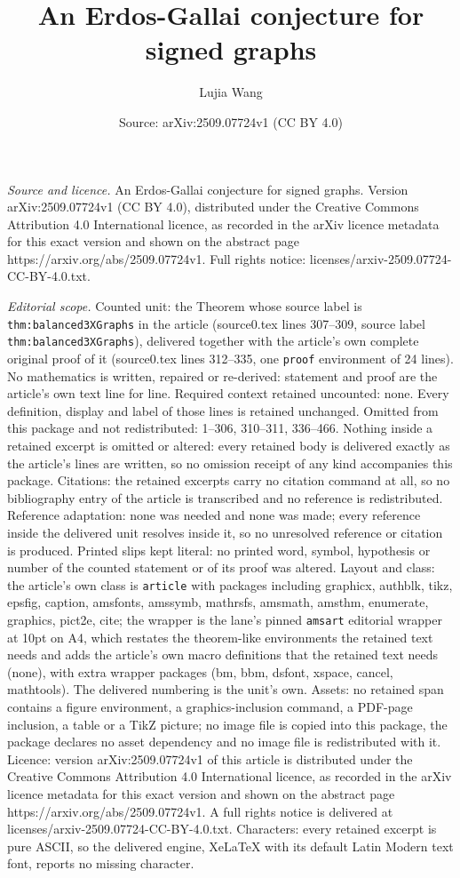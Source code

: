 \documentclass[10pt,a4paper]{amsart}
\title[An Erdos-Gallai conjecture for signed graphs]{An Erdos-Gallai conjecture for signed graphs}
\author{Lujia Wang}
\date{Source: arXiv:2509.07724v1 (CC BY 4.0)}
\begin{document}
\maketitle

\noindent\emph{Source and licence.} An Erdos-Gallai conjecture for signed graphs. Version arXiv:2509.07724v1 (CC BY 4.0), distributed under the Creative Commons Attribution 4.0 International licence, as recorded in the arXiv licence metadata for this exact version and shown on the abstract page https://arxiv.org/abs/2509.07724v1. Full rights notice: licenses/arxiv-2509.07724-CC-BY-4.0.txt.\par\smallskip

\noindent\textit{Editorial scope.} Counted unit: the Theorem whose source label is \texttt{thm:balanced3XGraphs} in the article (source0.tex lines 307--309, source label \texttt{thm:balanced3XGraphs}), delivered together with the article's own complete original proof of it (source0.tex lines 312--335, one \texttt{proof} environment of 24 lines). No mathematics is written, repaired or re-derived: statement and proof are the article's own text line for line. Required context retained uncounted: none. Every definition, display and label of those lines is retained unchanged. Omitted from this package and not redistributed: 1--306, 310--311, 336--466. Nothing inside a retained excerpt is omitted or altered: every retained body is delivered exactly as the article's lines are written, so no omission receipt of any kind accompanies this package. Citations: the retained excerpts carry no citation command at all, so no bibliography entry of the article is transcribed and no reference is redistributed. Reference adaptation: none was needed and none was made; every reference inside the delivered unit resolves inside it, so no unresolved reference or citation is produced. Printed slips kept literal: no printed word, symbol, hypothesis or number of the counted statement or of its proof was altered. Layout and class: the article's own class is \texttt{article} with packages including graphicx, authblk, tikz, epsfig, caption, amsfonts, amssymb, mathrsfs, amsmath, amsthm, enumerate, graphics, pict2e, cite; the wrapper is the lane's pinned \texttt{amsart} editorial wrapper at 10pt on A4, which restates the theorem-like environments the retained text needs and adds the article's own macro definitions that the retained text needs (none), with extra wrapper packages (bm, bbm, dsfont, xspace, cancel, mathtools). The delivered numbering is the unit's own. Assets: no retained span contains a figure environment, a graphics-inclusion command, a PDF-page inclusion, a table or a TikZ picture; no image file is copied into this package, the package declares no asset dependency and no image file is redistributed with it. Licence: version arXiv:2509.07724v1 of this article is distributed under the Creative Commons Attribution 4.0 International licence, as recorded in the arXiv licence metadata for this exact version and shown on the abstract page https://arxiv.org/abs/2509.07724v1. A full rights notice is delivered at licenses/arxiv-2509.07724-CC-BY-4.0.txt. Characters: every retained excerpt is pure ASCII, so the delivered engine, XeLaTeX with its default Latin Modern text font, reports no missing character.
\end{document}
